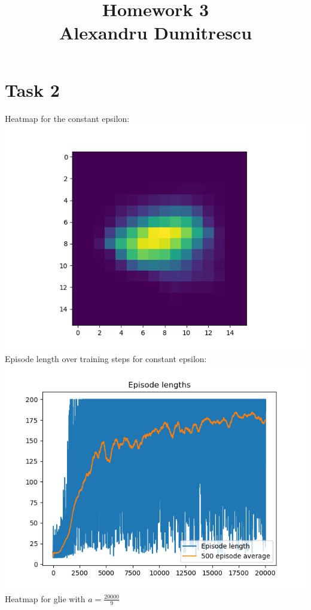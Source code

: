 \documentclass{article}
\title{Homework 3 \\ Alexandru Dumitrescu}
\date{}
\begin{document}
\maketitle
\section*{Task 2}

Heatmap for the constant epsilon: \\

\includegraphics[scale=0.45]{constepsnormtraining.png} \\
Episode length over training steps for constant epsilon: \\

\includegraphics[scale=0.45]{constepsnormaltraining.png}\\
\newpage
Heatmap for glie with $a = \frac{20000}{9}$
\end{document}
